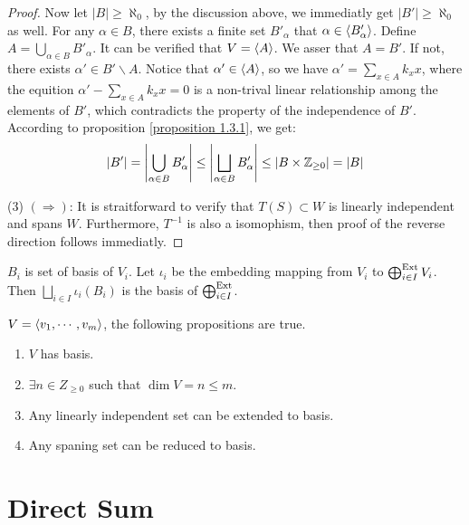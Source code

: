 \begin{proof}
    Now let $|B| \geq \aleph_0$, by the discussion above, we immediatly get $|B'| \geq \aleph_0$ as well. For any $\alpha \in B$, there exists a finite set $B'_{\alpha}$ that $\alpha \in \langle B'_{\alpha} \rangle$. Define $A = \bigcup_{\alpha \in B} B'_{\alpha}$. It can be verified that $V = \langle A \rangle$. We asser that $A = B'$. If not, there exists $\alpha' \in B' \smallsetminus A$. Notice that $\alpha' \in \langle A \rangle$, so we have $\alpha' = \sum_{x \in A} k_x x$, where the equition $\alpha' - \sum_{x \in A} k_x x = 0$ is a non-trival linear relationship among the elements of $B'$, which contradicts the property of the independence of $B'$. According to proposition \ref{proposition 1.3.1}, we get:
    $$
        |B'| = \left| \bigcup_{\alpha \in B} B'_{\alpha} \right| \leq \left| \bigsqcup_{\alpha \in B} B'_{\alpha} \right| \leq \left| B \times \mathbb Z_{\geq 0} \right| = |B|
    $$

    (3) $(\Rightarrow)$: It is straitforward to verify that $T(S) \subset W$ is linearly independent and spans $W$. Furthermore, $T^{-1}$ is also a isomophism, then proof of the reverse direction follows immediatly.
\end{proof}




\begin{proposition}
    $B_i$ is set of basis of $V_i$. Let $\iota_i$ be the embedding mapping from $V_i$ to $\bigoplus^{\mathrm{Ext}}_{i\in I} V_i$. Then $\bigsqcup_{i\in I} \iota_i (B_i)$ is the basis of $\bigoplus^{\mathrm{Ext}}_{i\in I}$.
\end{proposition}





\begin{proposition}
    $V = \langle v_1, \cdots, v_m \rangle$, the following propositions are true.
    \begin{enumerate}
        \item $V$ has basis.
        \item $\exists n \in Z_{\geq 0}$ such that $\dim V = n \leq m$.
        \item Any linearly independent set can be extended to basis.
        \item Any spaning set can be reduced to basis.
    \end{enumerate}
\end{proposition}








\section{Direct Sum}

